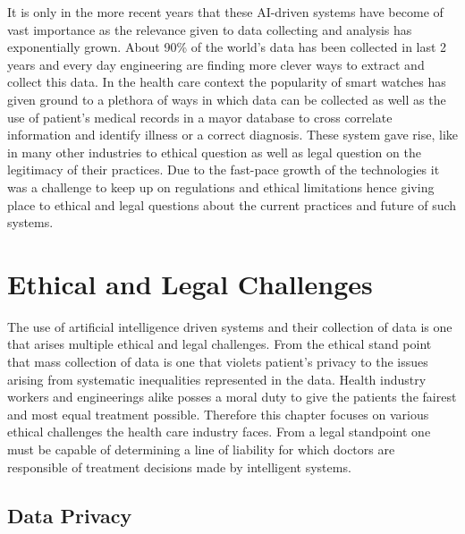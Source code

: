 \documentclass[a4paper,12pt,oneside]{report}
\begin{document}
It is only in the more recent years that these AI-driven systems have become of vast importance as the relevance given to data collecting and analysis has exponentially grown. About 90\% of the world's data has been collected in last 2 years and every day engineering are finding more clever ways to extract and collect this data. In the health care context the popularity of smart watches has given ground to a plethora of ways in which data can be collected as well as the use of patient's medical records in a mayor database to cross correlate information and identify illness or a correct diagnosis. These system gave rise, like in many other industries to ethical question as well as legal question on the legitimacy of their practices. Due to the fast-pace growth of the technologies it was a challenge to keep up on regulations and ethical limitations hence giving place to ethical and legal questions about the current practices and future of such systems. 

\chapter{Ethical and Legal Challenges}

The use of artificial intelligence driven systems and their collection of data is one that arises multiple ethical and legal challenges. From the ethical stand point that mass collection of data is one that violets patient's privacy to the issues arising from systematic inequalities represented in the data. Health industry workers and engineerings alike posses a moral duty to give the patients the fairest and most equal treatment possible. Therefore this chapter focuses on various ethical challenges the health care industry faces. From a legal standpoint one must be capable of determining a line of liability for which doctors are responsible of treatment decisions made by intelligent systems.

\section{Data Privacy}
\end{document}
